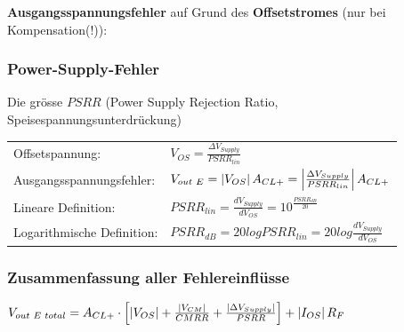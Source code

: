 			\begin{minipage}{18cm}
            	\vspace{3mm}
				\textbf{Ausgangsspannungsfehler} auf Grund des \textbf{Offsetstromes} (nur bei
				Kompensation(!)):
				\\
			\end{minipage}

		\subsubsection{Power-Supply-Fehler}
            Die grösse $PSRR$ (Power Supply Rejection Ratio, Speisespannungsunterdrückung)\\
            \begin{tabular}{ll}
            Offsetspannung:&
            $V_{OS}=\frac{\Delta V_{Supply}}{PSRR_{lin}}$\\
            Ausgangsspannungsfehler:&
            $V_{out \hspace{1mm}E}=\left|V_{OS}\right| A_{CL+}=\left| \frac{\Delta V_{Supply}}{PSRR_{lin}}\right| A_{CL+}$\\
            Lineare Definition: &
            $PSRR_{lin}=\frac{dV_{Supply}}{dV_{OS}}=10^{\frac{PSRR_{dB}}{20}}$\\
            Logarithmische Definition:&
            $PSRR_{dB}=20 log PSRR_{lin}=20 log \frac{dV_{Supply}}{dV_{OS}}$\\
            \end{tabular}
            

		\subsubsection{Zusammenfassung aller Fehlereinflüsse}
      $V_{out\hspace{1mm}E\hspace{1mm}total}=A_{CL+}\cdot\left[\left|V_{OS}\right|+\frac{\left|V_{CM}\right|}{CMRR}
            	+\frac{\left|\Delta V_{Supply}\right|}{PSRR}\right]+\left|I_{OS}\right|R_F$\\

